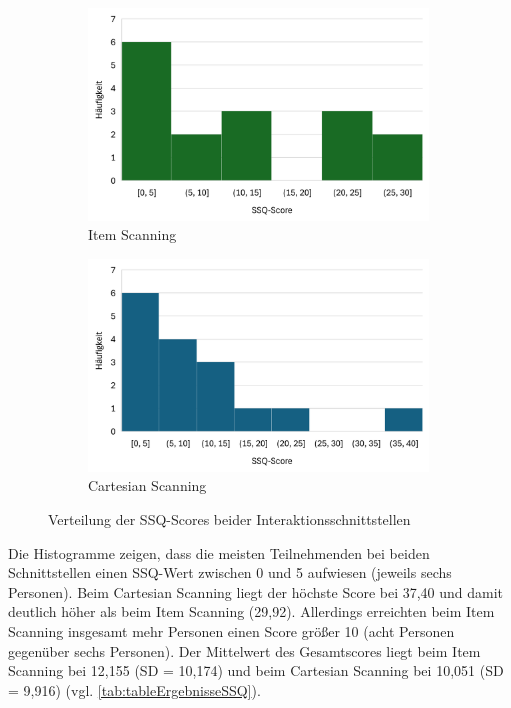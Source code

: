\begin{figure}
    \centering
    \begin{subfigure}{.5\textwidth}
        \centering
        \includegraphics[width=0.99\textwidth]{images/Results/Histogramm-SSQScores-Item.png}
        \caption{Item Scanning}
        \label{fig:histoSSQItem}   
    \end{subfigure}%
    \begin{subfigure}{.5\textwidth}
        \centering
        \includegraphics[width=0.99\textwidth]{images/Results/Histogramm-SSQScores-Cartesian.png}
         \caption{Cartesian Scanning}
         \label{fig:histoSSQCartesian}
    \end{subfigure}
    \caption{Verteilung der SSQ-Scores beider Interaktionsschnittstellen}
    \label{fig:histoSSQScore}
\end{figure}

Die Histogramme zeigen, dass die meisten Teilnehmenden bei beiden Schnittstellen einen SSQ-Wert zwischen 0 und 5 aufwiesen (jeweils sechs Personen). Beim Cartesian Scanning liegt der höchste Score bei 37,40 und damit deutlich höher als beim Item Scanning (29,92). Allerdings erreichten beim Item Scanning insgesamt mehr Personen einen Score größer 10 (acht Personen gegenüber sechs Personen). Der Mittelwert des Gesamtscores liegt beim Item Scanning bei 12,155 (SD = 10,174) und beim Cartesian Scanning bei 10,051 (SD = 9,916) (vgl. \autoref{tab:tableErgebnisseSSQ}).

